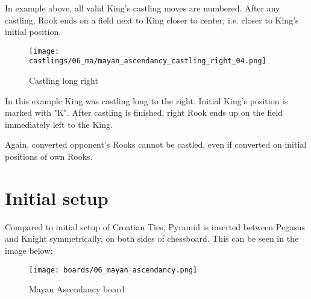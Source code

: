 In example above, all valid King's castling moves are numbered. After any castling, Rook
ends on a field next to King closer to center, i.e. closer to King's initial position.

\noindent
\begin{figure}[!h]
\texttt{[image: castlings/06\_ma/mayan\_ascendancy\_castling\_right\_04.png]}
\caption{Castling long right}
\label{fig:mayan_ascendancy_castling_right_04}
\end{figure}

In this example King was castling long to the right. Initial King's position is marked with "K".
After castling is finished, right Rook ends up on the field immediately left to the King.

Again, converted opponent's Rooks cannot be castled, even if converted on initial
positions of own Rooks.

\clearpage %

\section*{Initial setup}
\label{sec:Mayan Ascendancy/Initial setup}

Compared to initial setup of Croatian Ties, Pyramid is inserted between Pegasus and Knight
symmetrically, on both sides of chessboard. This can be seen in the image below:

\noindent
\begin{figure}[h]
\texttt{[image: boards/06\_mayan\_ascendancy.png]}
\caption{Mayan Ascendancy board}
\label{fig:06_mayan_ascendancy}
\end{figure}

\clearpage %
